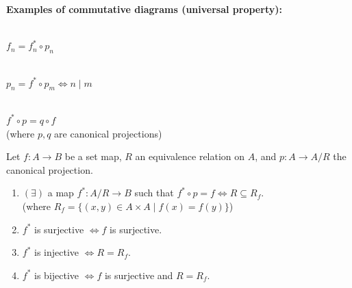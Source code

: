 \vspace{1em}
\textbf{Examples of commutative diagrams (universal property):}

\begin{center}
\begin{minipage}{0.3\textwidth}
\\[1ex] \centering $f_n = f_n^* \circ p_n$
\end{minipage}%
\begin{minipage}{0.3\textwidth}
\\[1ex] \centering $p_n = f^* \circ p_m \iff n \mid m$
\end{minipage}%
\begin{minipage}{0.3\textwidth}
\\[1ex] \centering $f^* \circ p = q \circ f$ \\
(where $p, q$ are canonical projections)
\end{minipage}
\end{center}

\begin{theorem}
Let $f: A \rightarrow B$ be a set map, $R$ an equivalence relation on $A$, and $p: A \rightarrow A/R$ the canonical projection.
\begin{enumerate}
    \item $(\exists)$ a map $f^*: A/R \rightarrow B$ such that $f^* \circ p = f \iff R \subseteq R_f$. \\
    (where $R_f = \{(x,y) \in A \times A \mid f(x) = f(y)\}$)
    \item $f^*$ is surjective $\iff f$ is surjective.
    \item $f^*$ is injective $\iff R = R_f$.
    \item $f^*$ is bijective $\iff f$ is surjective and $R = R_f$.
\end{enumerate}
\end{theorem}

